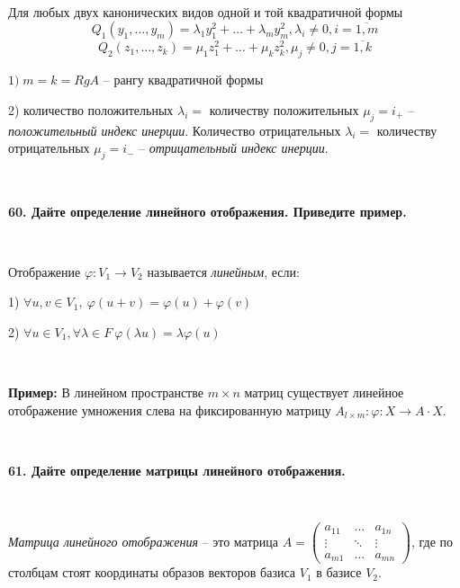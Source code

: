 \documentclass{article}
\begin{document}
	{
		$\;$
		\setlength{\parindent}{0.4cm}
		\hangindent=0.4cm
		
		Для любых двух канонических видов одной и той квадратичной формы
		$$Q_1(y_1, \ldots, y_m)=\lambda_1y_1^2+\ldots+\lambda_my_m^2, \lambda_i\ne0, i=\overline{1, m}$$
		$$Q_2(z_1, \ldots, z_k)=\mu_1z_1^2+\ldots+\mu_kz_k^2, \mu_j\ne0, j=\overline{1, k}$$
		
		$1)\; m=k=RgA$ -- рангу квадратичной формы
		
		2) количество положительных $\lambda_i=$ количеству положительных $\mu_j=i_+$ -- \textit{положительный индекс инерции}. Количество отрицательных $\lambda_i=$ количеству отрицательных $\mu_j=i_-$ -- \textit{отрицательный индекс инерции}.
		
		$\;$
		\setlength{\parindent}{0cm}
		\hangindent=0cm
	}
	
	\newpage
	
	\textbf{60. Дайте определение линейного отображения. Приведите пример.}
	
	{
		$\;$
		\setlength{\parindent}{0.4cm}
		\hangindent=0.4cm
		
		Отображение $\varphi: V_1\rightarrow V_2$ называется \textit{линейным}, если:
		
		1) $\forall u, v\in V_1, \ \varphi(u+v)=\varphi(u)+\varphi(v)$
		
		2) $\forall u\in V_1, \forall \lambda\in F\ \varphi(\lambda u)=\lambda\varphi(u)$
		
		$\;$
		
		\textbf{Пример:} В линейном пространстве $m\times n$ матриц существует линейное отображение умножения слева на фиксированную матрицу $A_{l\times m}: \varphi:X\rightarrow A\cdot X$.
		
		$\;$
		\setlength{\parindent}{0cm}
		\hangindent=0cm
	}
	
	\textbf{61. Дайте определение матрицы линейного отображения.}
	
	{
		$\;$
		\setlength{\parindent}{0.4cm}
		\hangindent=0.4cm
		
		\textit{Матрица линейного отображения} -- это матрица $A=\begin{pmatrix}
		a_{11}&\ldots&a_{1n}\\
		\vdots&\ddots&\vdots\\
		a_{m1}&\ldots&a_{mn}
		\end{pmatrix}$, где по столбцам стоят координаты образов векторов базиса $V_1$ в базисе $V_2$.
		
		$\;$
		\setlength{\parindent}{0cm}
		\hangindent=0cm
	}
	
\end{document}
